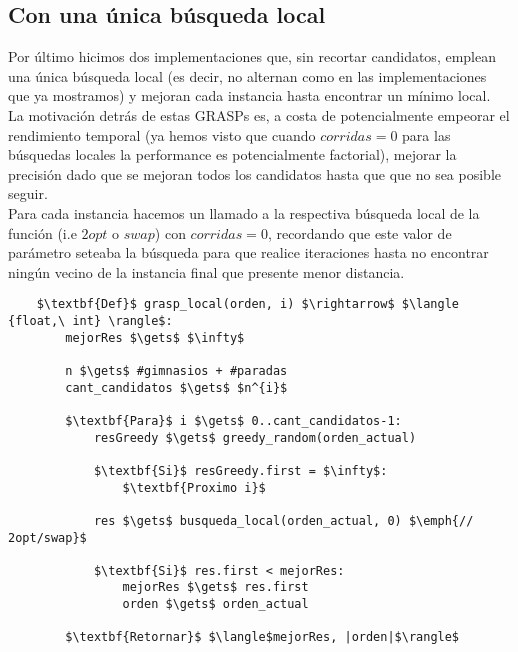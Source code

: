 \subsection{Con una única búsqueda local}
Por último hicimos dos implementaciones que, sin recortar candidatos, emplean una única búsqueda local (es decir, no alternan como en las implementaciones que ya mostramos) y mejoran cada instancia hasta encontrar un mínimo local.
\\

La motivación detrás de estas GRASPs es, a costa de potencialmente empeorar el rendimiento temporal (ya hemos visto que cuando $corridas=0$ para las búsquedas locales la performance es potencialmente factorial), mejorar la precisión dado que se mejoran todos los candidatos hasta que que no sea posible seguir.
\\

Para cada instancia hacemos un llamado a la respectiva búsqueda local de la función (i.e $2opt$ o $swap$) con $corridas=0$, recordando que este valor de parámetro seteaba la búsqueda para que realice iteraciones hasta no encontrar ningún vecino de la instancia final que presente menor distancia.

\begin{lstlisting}
    $\textbf{Def}$ grasp_local(orden, i) $\rightarrow$ $\langle {float,\ int} \rangle$:
        mejorRes $\gets$ $\infty$

        n $\gets$ #gimnasios + #paradas
        cant_candidatos $\gets$ $n^{i}$

        $\textbf{Para}$ i $\gets$ 0..cant_candidatos-1:
            resGreedy $\gets$ greedy_random(orden_actual)

            $\textbf{Si}$ resGreedy.first = $\infty$:
                $\textbf{Proximo i}$

            res $\gets$ busqueda_local(orden_actual, 0) $\emph{// 2opt/swap}$

            $\textbf{Si}$ res.first < mejorRes:
                mejorRes $\gets$ res.first
                orden $\gets$ orden_actual

        $\textbf{Retornar}$ $\langle$mejorRes, |orden|$\rangle$
\end{lstlisting}
